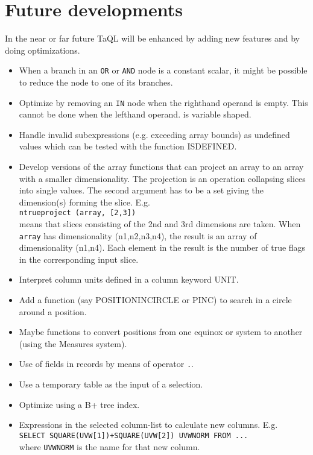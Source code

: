 \section{Future developments}
In the near or far future TaQL will be enhanced by adding new
features and by doing optimizations.
\begin{itemize}
  \item When a branch in an \texttt{OR} or \texttt{AND} node is a
    constant scalar, it might be possible to reduce the node to
    one of its branches.
  \item Optimize by removing an \texttt{IN} node when the righthand
    operand is empty. This cannot be done when the lefthand operand.
    is variable shaped.
  \item Handle invalid subexpressions (e.g. exceeding array bounds)
    as undefined values
    which can be tested with the function ISDEFINED.
  \item Develop versions of the array functions that can project
    an array to an array with a smaller dimensionality. The projection
    is an operation collapsing slices into single values.
    The second argument has to be a set giving the
    dimension(s) forming the slice. E.g.
    \\\texttt{ntrueproject (array, [2,3])}
    \\means that slices consisting of the 2nd and 3rd dimensions are
    taken. When \texttt{array} has dimensionality (n1,n2,n3,n4), the result is
    an array of dimensionality (n1,n4). Each element in the result is
    the number of true flags in the corresponding input slice.
  \item Interpret column units defined in a column keyword UNIT.
  \item Add a function (say POSITIONINCIRCLE or PINC) to search in a circle
       around a position.
  \item Maybe functions to convert positions from one equinox or system
       to another (using the Measures system).
  \item Use of fields in records by means of operator \texttt{.}.
  \item Use a temporary table as the input of a selection.
  \item Optimize using a B+ tree index.
  \item Expressions in the selected column-list to calculate new columns. E.g.
       \\\texttt{SELECT SQUARE(UVW[1])+SQUARE(UVW[2]) UVWNORM FROM ...}
       \\where \texttt{UVWNORM} is the name for that new column.
\end{itemize}
